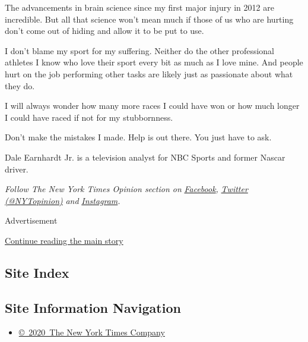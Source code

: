 The advancements in brain science since my first major injury in 2012
are incredible. But all that science won't mean much if those of us who
are hurting don't come out of hiding and allow it to be put to use.

I don't blame my sport for my suffering. Neither do the other
professional athletes I know who love their sport every bit as much as I
love mine. And people hurt on the job performing other tasks are likely
just as passionate about what they do.

I will always wonder how many more races I could have won or how much
longer I could have raced if not for my stubbornness.

Don't make the mistakes I made. Help is out there. You just have to ask.

Dale Earnhardt Jr. is a television analyst for NBC Sports and former
Nascar driver.

\emph{Follow The New York Times Opinion section on}
\href{https://www.facebookcorewwwi.onion/nytopinion}{\emph{Facebook}}\emph{,}
\href{http://twitter.com/NYTOpinion}{\emph{Twitter (@NYTopinion)}}
\emph{and}
\href{https://www.instagram.com/nytopinion/}{\emph{Instagram}}\emph{.}

Advertisement

\protect\hyperlink{after-bottom}{Continue reading the main story}

\hypertarget{site-index}{%
\subsection{Site Index}\label{site-index}}

\hypertarget{site-information-navigation}{%
\subsection{Site Information
Navigation}\label{site-information-navigation}}

\begin{itemize}
\tightlist
\item
  \href{https://help.nytimes3xbfgragh.onion/hc/en-us/articles/115014792127-Copyright-notice}{©~2020~The
  New York Times Company}
\end{itemize}

